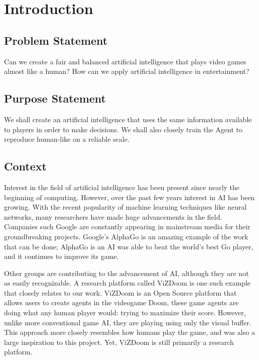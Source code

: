 \chapter{Introduction}


\section{Problem Statement} 

Can we create a fair and balanced artificial intelligence that plays video games almost like a human? How can we apply artificial intelligence in entertainment?




\section{Purpose Statement} 

We shall create an artificial intelligence that uses the same information available to players in order to make decisions. We shall also closely train the Agent to reproduce human-like on a reliable scale. 





\section{Context} 

Interest in the field of artificial intelligence has been present since nearly the beginning of computing. However, over the past few years interest in AI has been growing. With the recent popularity of machine learning techniques like neural networks, many researchers have made huge advancements in the field. Companies such Google are constantly appearing in mainstream media for their groundbreaking projects. Google's AlphaGo is an amazing example of the work that can be done; AlphaGo is an AI was able to beat the world's best Go player, and it continues to improve its game.

Other groups are contributing to the advancement of AI, although they are not as easily recognizable. A research platform called ViZDoom is one such example that closely relates to our work. ViZDoom is an Open Source platform that allows users to create agents in the videogame Doom, these game agents are doing what any human player would: trying to maximize their score. However, unlike more conventional game AI, they are playing using only the visual buffer. This approach more closely resembles how humans play the game, and was also a large inspiration to this project. Yet, ViZDoom is still primarily a research platform.

